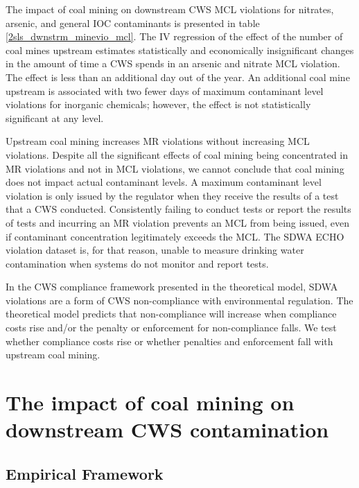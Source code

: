 \documentclass{article}
\begin{document}
The impact of coal mining on downstream CWS MCL violations for nitrates, arsenic, and general IOC contaminants is presented in table \ref{2sls_dwnstrm_minevio_mcl}. The IV regression of the effect of the number of coal mines upstream estimates statistically and economically insignificant changes in the amount of time a CWS spends in an arsenic and nitrate MCL violation. The effect is less than an additional day out of the year. An additional coal mine upstream is associated with two fewer days of maximum contaminant level violations for inorganic chemicals; however, the effect is not statistically significant at any level.

Upstream coal mining increases MR violations without increasing MCL violations. Despite all the significant effects of coal mining being concentrated in MR violations and not in MCL violations, we cannot conclude that coal mining does not impact actual contaminant levels. A maximum contaminant level violation is only issued by the regulator when they receive the results of a test that a CWS conducted. Consistently failing to conduct tests or report the results of tests and incurring an MR violation prevents an MCL from being issued, even if contaminant concentration legitimately exceeds the MCL. The SDWA ECHO violation dataset is, for that reason, unable to measure drinking water contamination when systems do not monitor and report tests.

In the CWS compliance framework presented in the theoretical model, SDWA violations are a form of CWS non-compliance with environmental regulation. The theoretical model predicts that non-compliance will increase when compliance costs rise and/or the penalty or enforcement for non-compliance falls. We test whether compliance costs rise or whether penalties and enforcement fall with upstream coal mining.







\section{The impact of coal mining on downstream CWS contamination}

\subsection{Empirical Framework}
\end{document}
